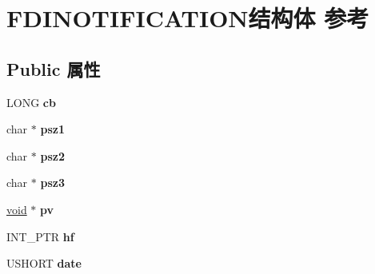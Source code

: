 \hypertarget{struct_f_d_i_n_o_t_i_f_i_c_a_t_i_o_n}{}\section{F\+D\+I\+N\+O\+T\+I\+F\+I\+C\+A\+T\+I\+O\+N结构体 参考}
\label{struct_f_d_i_n_o_t_i_f_i_c_a_t_i_o_n}
\subsection*{Public 属性}
\begin{DoxyCompactItemize}
\item 
\mbox{\label{struct_f_d_i_n_o_t_i_f_i_c_a_t_i_o_n_afb53c46a94a6b48a490e00f6ef760749}} 
L\+O\+NG {\bfseries cb}
\item 
\mbox{\label{struct_f_d_i_n_o_t_i_f_i_c_a_t_i_o_n_abd10ce99d0a410addbf463e8ebf13ba6}} 
char $\ast$ {\bfseries psz1}
\item 
\mbox{\label{struct_f_d_i_n_o_t_i_f_i_c_a_t_i_o_n_a28080ba41f4921ee6171f7291658ff8a}} 
char $\ast$ {\bfseries psz2}
\item 
\mbox{\label{struct_f_d_i_n_o_t_i_f_i_c_a_t_i_o_n_a0f823cc31e0dacb69c226b1483f913af}} 
char $\ast$ {\bfseries psz3}
\item 
\mbox{\label{struct_f_d_i_n_o_t_i_f_i_c_a_t_i_o_n_a5727cc786e4935b6b01dddbf77ffd5d9}} 
\hyperlink{interfacevoid}{void} $\ast$ {\bfseries pv}
\item 
\mbox{\label{struct_f_d_i_n_o_t_i_f_i_c_a_t_i_o_n_a7391ae7b3b07c3ff89284932660cc36f}} 
I\+N\+T\+\_\+\+P\+TR {\bfseries hf}
\item 
\mbox{\label{struct_f_d_i_n_o_t_i_f_i_c_a_t_i_o_n_ac1681b9ec4fbeffbccad012804be4ef9}} 
U\+S\+H\+O\+RT {\bfseries date}
\item 
\mbox{\label{struct_f_d_i_n_o_t_i_f_i_c_a_t_i_o_n_a49c0c2a6f6b75e7867ddd2e9d9e3328a}} 

\end{DoxyCompactItemize}
